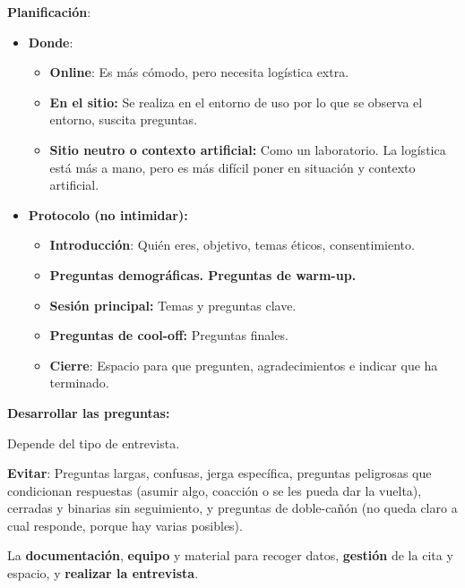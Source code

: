 \documentclass[12pt]{report} %
\begin{document}
\textbf{Planificación}:

\begin{itemize}

\item
  \textbf{Donde}:

  \begin{itemize}
  
  \item
    \textbf{Online}: Es más cómodo, pero necesita logística extra.
    
    \item
      \textbf{En el sitio:} Se realiza en el entorno de uso por lo que
      se observa el entorno, suscita preguntas.
    \item
      \textbf{Sitio neutro o contexto artificial:} Como un laboratorio.
      La logística está más a mano, pero es más difícil poner en
      situación y contexto artificial.
  \end{itemize}
\item
  \textbf{Protocolo (no intimidar):}

  \begin{itemize}
  
  \item
    \textbf{Introducción}: Quién eres, objetivo, temas éticos,
    consentimiento.

    
    \item
      \textbf{Preguntas demográficas. Preguntas de warm-up.}
    \item
      \textbf{Sesión principal:} Temas y preguntas clave.
    \item
      \textbf{Preguntas de cool-off:} Preguntas finales.
    \item
      \textbf{Cierre}: Espacio para que pregunten, agradecimientos e indicar que ha terminado.
  \end{itemize}
\end{itemize}

\textbf{Desarrollar las preguntas:}

Depende del tipo de entrevista.

\textbf{Evitar}: Preguntas largas, confusas, jerga específica, preguntas
peligrosas que condicionan respuestas (asumir algo, coacción o se les
pueda dar la vuelta), cerradas y binarias sin seguimiento, y preguntas
de doble-cañón (no queda claro a cual responde, porque hay varias
posibles).

La \textbf{documentación}, \textbf{equipo} y material para recoger
datos, \textbf{gestión} de la cita y espacio, y \textbf{realizar la
entrevista}.
\end{document}
